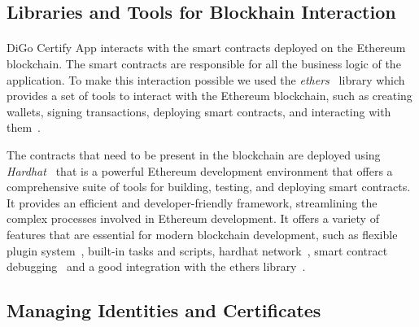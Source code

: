 \subsection{Libraries and Tools for Blockhain Interaction}\label{subsec:utilizing-libraries-and-tools}
\paragraph{}

DiGo Certify App interacts with the smart contracts deployed on the Ethereum blockchain. The smart contracts are responsible for all the business logic of the application.
To make this interaction possible we used the \textit{ethers~\cite{ethers}} library which provides a set of tools to interact with the Ethereum blockchain, such as creating wallets, signing transactions, deploying smart contracts, and interacting with them~\cite{ethersDocs}.

The contracts that need to be present in the blockchain are deployed using \textit{Hardhat~\cite{hardhat}} that is a powerful Ethereum development environment that offers a comprehensive suite of tools for building, testing, and deploying smart contracts.
It provides an efficient and developer-friendly framework, streamlining the complex processes involved in Ethereum development. It offers a variety of features that are essential for modern blockchain development, such as
flexible plugin system~\cite{hardhatPlugins}, built-in tasks and scripts, hardhat network~\cite{hardhatNetwork}, smart contract debugging~\cite{hardhatDebug} and a good integration with the ethers library~\cite{hardhatWithEthers}.

\subsection{Managing Identities and Certificates}\label{subsec:managing-identities-and-certificates}
\paragraph{}

